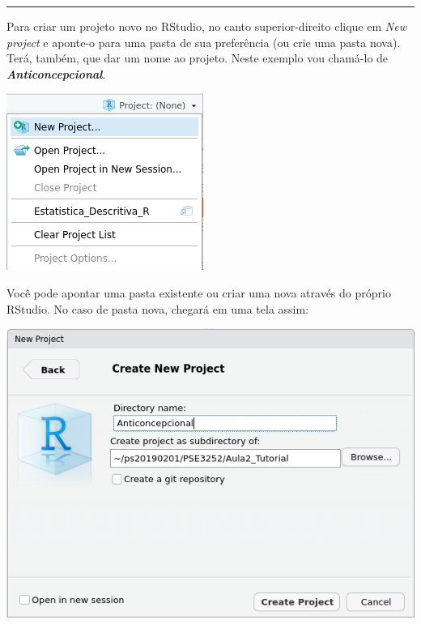 \documentclass[
]{article}
\begin{document}
\begin{center}\rule{0.5\linewidth}{0.5pt}\end{center}

Para criar um projeto novo no RStudio, no canto superior-direito clique
em \emph{New project} e aponte-o para uma pasta de sua preferência (ou
crie uma pasta nova). Terá, também, que dar um nome ao projeto. Neste
exemplo vou chamá-lo de \emph{\textbf{Anticoncepcional}}.

\begin{center}\includegraphics[width=0.9\linewidth]{RStudio_criaprojeto} \end{center}

Você pode apontar uma pasta existente ou criar uma nova através do
próprio RStudio. No caso de pasta nova, chegará em uma tela assim:

\begin{center}\includegraphics[width=0.9\linewidth]{RStudio_projetonovo} \end{center}
\end{document}
